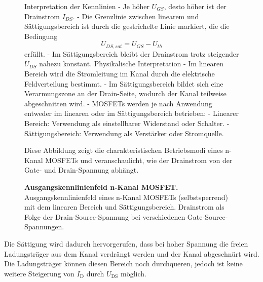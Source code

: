 {\begin{figure}[H]
{    Interpretation der Kennlinien
    - Je höher \( U_{GS} \), desto höher ist der Drainstrom \( I_{DS} \).  
    - Die Grenzlinie zwischen linearem und Sättigungsbereich ist durch die gestrichelte Linie markiert, die die Bedingung  
    \[
    U_{DS, sat} = U_{GS} - U_{th}
    \]
    erfüllt.  
    - Im Sättigungsbereich bleibt der Drainstrom trotz steigender \( U_{DS} \) nahezu konstant.  
    Physikalische Interpretation
    - Im linearen Bereich wird die Stromleitung im Kanal durch die elektrische Feldverteilung bestimmt.  
    - Im Sättigungsbereich bildet sich eine Verarmungszone an der Drain-Seite, wodurch der Kanal teilweise abgeschnitten wird.  
    - MOSFETs werden je nach Anwendung entweder im linearen oder im Sättigungsbereich betrieben:  
    - Linearer Bereich: Verwendung als einstellbarer Widerstand oder Schalter.  
    - Sättigungsbereich: Verwendung als Verstärker oder Stromquelle.  

    Diese Abbildung zeigt die charakteristischen Betriebsmodi eines n-Kanal MOSFETs und veranschaulicht, wie der Drainstrom von der Gate- und Drain-Spannung abhängt.}
    \caption{\textbf{Ausgangskennlinienfeld n-Kanal MOSFET.} Ausgangskennlinienfeld eines n-Kanal MOSFETs 
    (selbstsperrend) mit dem linearen Bereich und Sättigungsbereich. Drainstrom als Folge der Drain-Source-Spannung bei 
    verschiedenen Gate-Source-Spannungen.}  
    \label{fig:AusgangskennlinienfeldN-KanalMOSFET}
\end{figure}

Die Sättigung wird dadurch hervorgerufen, dass bei hoher Spannung die freien Ladungsträger aus dem
Kanal verdrängt werden und der Kanal abgeschnürt wird. Die Ladungsträger können diesen Bereich
noch durchqueren, jedoch ist keine weitere Steigerung von $I_\mathrm{D}$ durch $U_\mathrm{DS}$ möglich.

}
